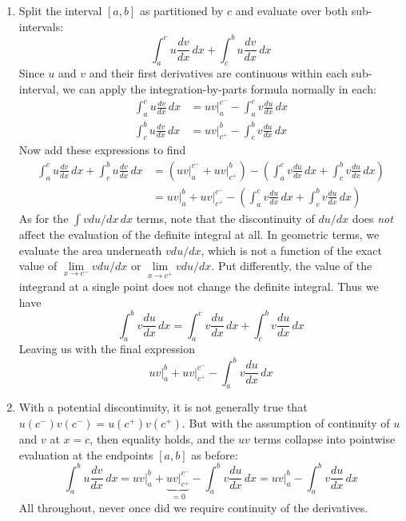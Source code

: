 \documentclass[a4paper]{article}
\begin{document}
\begin{enumerate}[label=(\alph*)]
	\item Split the interval \( \!\left[ a,b \right] \) as partitioned by \( c \) and evaluate over both sub-intervals:
	\[
		\int^{c}_{a} u \frac{d v}{d x} \, dx + \int^{b}_{c} u \frac{d v}{d x} \, dx   
	\]
	Since \( u \) and \( v \) and their first derivatives are continuous within each sub-interval, we can apply the integration-by-parts formula normally in each:
	\begin{align*}
		\int^{c}_{a} u \frac{d v}{d x} \, dx & = uv \Big|^{c^{-}}_{a} - \int^{c}_{a} v \frac{d u}{d x} \, dx \\
		\int^{b}_{c} u \frac{d v}{d x} \, dx & = uv \Big|^{b}_{c^{+}} - \int^{b}_{c} v \frac{d u}{d x} \, dx
	\end{align*}
	Now add these expressions to find
	\begin{align*}
		\int^{c}_{a} u \frac{d v}{d x} \, dx + \int^{b}_{c} u \frac{d v}{d x} \, dx & = \!\left( uv \Big|^{c^{-}}_{a} + uv \Big|^{b}_{c^{+}} \right) - \!\left( \int^{c}_{a} v \frac{d u}{d x} \, dx + \int^{b}_{c} v \frac{d u}{d x} \, dx \right) \\
											    & = uv \Big|^{b}_{a} + uv \Big|^{c^{-}}_{c^{+}} - \!\left( \int^{c}_{a} v \frac{d u}{d x} \, dx + \int^{b}_{c} v \frac{d u}{d x} \, dx \right)
	 \end{align*}
	As for the \( \int v du / dx \, dx \) terms, note that the discontinuity of \( du / dx \) does \textit{not} affect the evaluation of the definite integral at all. In geometric terms, we evaluate the area underneath \( v du / dx \), which is not a function of the exact value of \( \lim\limits_{x \to c^{-}} v du / dx \) or \( \lim\limits_{x \to c^{+}} v du / dx \). Put differently, the value of the integrand at a single point does not change the definite integral. Thus we have
	\[
		\int^{b}_{a} v \frac{d u}{d x} \, dx = \int^{c}_{a} v \frac{d u}{d x} \, dx + \int^{b}_{c} v \frac{d u}{d x} \, dx  
	\]
	Leaving us with the final expression
	\[
		 uv \Big|^{b}_{a} + uv \Big|^{c^{-}}_{c^{+}} - \int^{b}_{a} v \frac{d u}{d x} \, dx
	\]
	\item With a potential discontinuity, it is not generally true that \( u \!\left( c^{-} \right) v \!\left( c^{-} \right) = u \!\left( c^{+} \right) v \!\left( c^{+} \right) \). But with the assumption of continuity of \( u \) and \( v \) at \( x = c \), then equality holds, and the \( uv \) terms collapse into pointwise evaluation at the endpoints \( \!\left[ a,b \right] \) as before:
	\[
		\int^{b}_{a} u \frac{d v}{d x} \, dx = uv \Big|^{b}_{a} + \underbrace{uv \Big|^{c^{-}}_{c^{+}}}_{= 0} - \int^{b}_{a} v \frac{d u}{d x} \, dx = uv \Big|^{b}_{a} - \int^{b}_{a} v \frac{d u}{d x} \, dx 
	\]
	All throughout, never once did we require continuity of the derivatives.
\end{enumerate}
\end{document}
